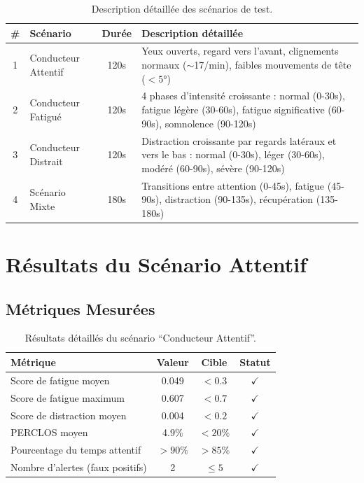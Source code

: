 \documentclass[12pt,a4paper,twoside]{report}
\begin{document}
\begin{table}[H]
\centering
\caption{Description détaillée des scénarios de test.}
\label{tab:scenarios}
\renewcommand{\arraystretch}{1.4}
\begin{tabularx}{\textwidth}{|c|l|c|X|}
\hline
\rowcolor{stellantisblue!15}
\textbf{\#} & \textbf{Scénario} & \textbf{Durée} & \textbf{Description détaillée} \\
\hline
1 & Conducteur Attentif & 120s & Yeux ouverts, regard vers l'avant, clignements normaux ($\sim$17/min), faibles mouvements de tête ($<5°$) \\
\hline
2 & Conducteur Fatigué & 120s & 4 phases d'intensité croissante : normal (0-30s), fatigue légère (30-60s), fatigue significative (60-90s), somnolence (90-120s) \\
\hline
3 & Conducteur Distrait & 120s & Distraction croissante par regards latéraux et vers le bas : normal (0-30s), léger (30-60s), modéré (60-90s), sévère (90-120s) \\
\hline
4 & Scénario Mixte & 180s & Transitions entre attention (0-45s), fatigue (45-90s), distraction (90-135s), récupération (135-180s) \\
\hline
\end{tabularx}
\end{table}

\section{Résultats du Scénario Attentif}

\subsection{Métriques Mesurées}

\begin{table}[H]
\centering
\caption{Résultats détaillés du scénario ``Conducteur Attentif''.}
\label{tab:results_attentif}
\renewcommand{\arraystretch}{1.3}
\begin{tabular}{|l|c|c|c|}
\hline
\rowcolor{green!15}
\textbf{Métrique} & \textbf{Valeur} & \textbf{Cible} & \textbf{Statut} \\
\hline
Score de fatigue moyen & 0.049 & $< 0.3$ & $\checkmark$ \\
\hline
Score de fatigue maximum & 0.607 & $< 0.7$ & $\checkmark$ \\
\hline
Score de distraction moyen & 0.004 & $< 0.2$ & $\checkmark$ \\
\hline
PERCLOS moyen & 4.9\% & $< 20\%$ & $\checkmark$ \\
\hline
Pourcentage du temps attentif & $> 90\%$ & $> 85\%$ & $\checkmark$ \\
\hline
Nombre d'alertes (faux positifs) & 2 & $\leq 5$ & $\checkmark$ \\
\hline
\end{tabular}
\end{table}
\end{document}
